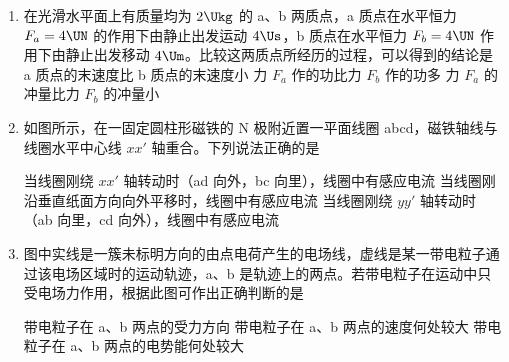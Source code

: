 \documentclass[\gkver]{gaokaozhenti}
\begin{document}
\begin{enumerate}

\item
在光滑水平面上有质量均为 $2\Ukg$ 的 a、b 两质点，a 质点在水平恒力 $F_{a} = 4\UN$ 的作用下由静止出发运动 $4\Us$，b 质点在水平恒力 $F_{b} = 4\UN$ 作用下由静止出发移动 $4\Um$。比较这两质点所经历的过程，可以得到的结论是
{a 质点的末速度比 b 质点的末速度小}
{力 $F_{a}$ 作的功比力 $F_{b}$ 作的功多}
{力 $F_{a}$ 的冲量比力 $F_{b}$ 的冲量小}


\item
如图所示，在一固定圆柱形磁铁的 N 极附近置一平面线圈 abcd，磁铁轴线与线圈水平中心线 $xx'$ 轴重合。下列说法正确的是

\onepicture[w=4.43cm]{}

{当线圈刚绕 $xx'$ 轴转动时（ad 向外，bc 向里），线圈中有感应电流}
{当线圈刚沿垂直纸面方向向外平移时，线圈中有感应电流}
{当线圈刚绕 $yy'$ 轴转动时（ab 向里，cd 向外），线圈中有感应电流}


\item
图中实线是一簇未标明方向的由点电荷产生的电场线，虚线是某一带电粒子通过该电场区域时的运动轨迹，a、b 是轨迹上的两点。若带电粒子在运动中只受电场力作用，根据此图可作出正确判断的是

\onepicture[w=3.44cm]{}

{带电粒子在 a、b 两点的受力方向}
{带电粒子在 a、b 两点的速度何处较大}
{带电粒子在 a、b 两点的电势能何处较大}



\end{enumerate}
\end{document}

